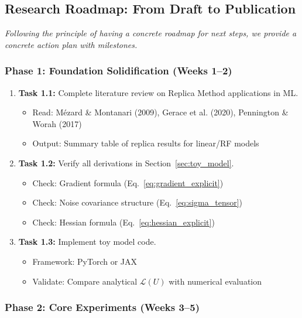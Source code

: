 \documentclass[
  journal=largetwo,
  year=2025,
  volume=37,
]{cup-journal}
\begin{document}
\subsection{Research Roadmap: From Draft to Publication}\label{sec:roadmap}

\textit{Following the principle of having a concrete roadmap for next steps, we provide a concrete action plan with milestones.}

\subsubsection{Phase 1: Foundation Solidification (Weeks 1--2)}

\begin{enumerate}
    \item[$\square$] \textbf{Task 1.1:} Complete literature review on Replica Method applications in ML.
    \begin{itemize}
        \item Read: Mézard \& Montanari (2009), Gerace et al. (2020), Pennington \& Worah (2017)
        \item Output: Summary table of replica results for linear/RF models
    \end{itemize}
    
    \item[$\square$] \textbf{Task 1.2:} Verify all derivations in Section~\ref{sec:toy_model}.
    \begin{itemize}
        \item Check: Gradient formula (Eq.~\ref{eq:gradient_explicit})
        \item Check: Noise covariance structure (Eq.~\ref{eq:sigma_tensor})
        \item Check: Hessian formula (Eq.~\ref{eq:hessian_explicit})
    \end{itemize}
    
    \item[$\square$] \textbf{Task 1.3:} Implement toy model code.
    \begin{itemize}
        \item Framework: PyTorch or JAX
        \item Validate: Compare analytical $\mathcal{L}(U)$ with numerical evaluation
    \end{itemize}
\end{enumerate}

\subsubsection{Phase 2: Core Experiments (Weeks 3--5)}
\end{document}
